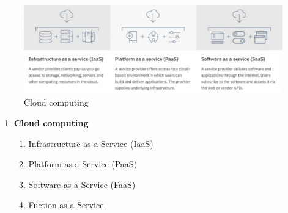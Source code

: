 \documentclass[11pt, twoside]{article}   	%
\begin{document}
     \begin{figure}
    [!htb]\centering
    \includegraphics[width=5in]{CloudComputing2.png}%
    \caption{Cloud computing}
  \label{fig:phase}
  \end{figure}
\renewcommand{\labelenumii}{\alph{enumii}}
\begin{enumerate}
\item \textbf{Cloud computing}
  \begin{enumerate}
    \item Infrastructure-as-a-Service (IaaS)
     \item Platform-as-a-Service (PaaS)
     \item Software-as-a-Service (FaaS)
     \item Fuction-as-a-Service 
     \end {enumerate}



\end{enumerate}
\end{document}
